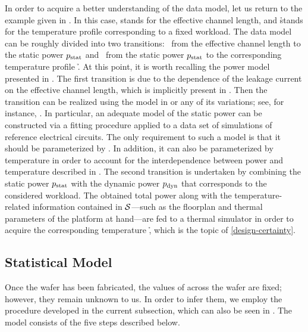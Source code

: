 In order to acquire a better understanding of the data model, let us return to
the example given in . In this case, \g stands for the
effective channel length, and \h stands for the temperature profile
corresponding to a fixed workload. The data model can be roughly divided into
two transitions: \one~from the effective channel length \g to the static power
$p_{\mathrm{stat}}$ and \two~from the static power $p_{\mathrm{stat}}$ to the corresponding
temperature profile \h. At this point, it is worth recalling the power model
presented in . The first transition is due to the dependence
of the leakage current on the effective channel length, which is implicitly
present in . Then the transition can be realized using the
model in  or any of its variations; see, for instance,
\cite{chandrakasan2000, srivastava2010, juan2012}. In particular, an adequate
model of the static power can be constructed via a fitting procedure applied to
a data set of  simulations of reference electrical circuits. The only
requirement to such a model is that it should be parameterized by \g. In
addition, it can also be parameterized by temperature in order to account for
the interdependence between power and temperature described in
. The second transition is undertaken by combining the
static power $p_{\mathrm{stat}}$ with the dynamic power $p_{\mathrm{dyn}}$ that corresponds
to the considered workload. The obtained total power along with the
temperature-related information contained in $\mathcal{S}$---such as the floorplan and
thermal parameters of the platform at hand---are fed to a thermal simulator in
order to acquire the corresponding temperature \h, which is the topic of
\cref{design-certainty}.

\subsection{Statistical Model}

Once the wafer has been fabricated, the values of \g across the wafer are fixed;
however, they remain unknown to us. In order to infer them, we employ the
procedure developed in the current subsection, which can also be seen in
. The model consists of the five steps
described below.

